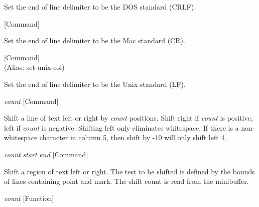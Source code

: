 \begin{doc-string}
Set the end of line delimiter to be the DOS standard (CRLF).
\end{doc-string}

\vspace{1em}
\noindent
{}
\usebox{\funcname}
 \hfill [Command]

\begin{doc-string}
Set the end of line delimiter to be the Mac standard (CR).
\end{doc-string}

\vspace{1em}
\noindent
{}
\usebox{\funcname}
 \hfill [Command]\\%
 (Alias: set-unix-eol)

\begin{doc-string}
Set the end of line delimiter to be the Unix standard (LF).
\end{doc-string}

\vspace{1em}
\noindent
{}
\usebox{\funcname}\emph{count}
 \hfill [Command]

\begin{doc-string}
Shift a line of text left or right by \emph{count} positions.  Shift right
if \emph{count} is positive, left if \emph{count} is negative.  Shifting left only
eliminates whitespace.  If there is a non-whitespace character in column
5, then shift by -10 will only shift left 4.
\end{doc-string}

\vspace{1em}
\noindent
{}
\usebox{\funcname}\emph{count} \emph{start} \emph{end}
 \hfill [Command]

\begin{doc-string}
Shift a region of text left or right.  The test to be shifted is defined
by the bounds of lines containing point and mark.  The shift count is
read from the minibuffer.
\end{doc-string}

\vspace{1em}
\noindent
{}
\usebox{\funcname}\emph{count}
 \hfill [Function]


